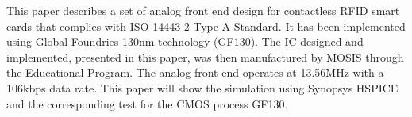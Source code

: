 This paper describes a set of analog front end design for contactless RFID smart cards that complies with ISO 14443-2 Type A Standard. It has been implemented using Global Foundries 130nm technology (GF130). The IC designed and implemented, presented in this paper, was then manufactured by MOSIS through the Educational Program. The analog front-end operates at 13.56MHz with a 106kbps data rate. This paper will show the simulation using Synopsys HSPICE and the corresponding test for the CMOS process GF130.